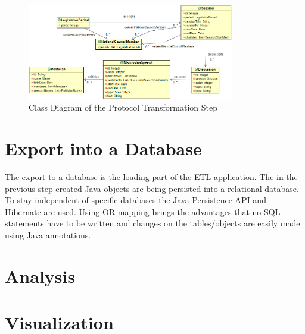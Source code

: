 \begin{figure}
	\centering
	\includegraphics[width=341px]{imgs/session_class_diagram}
	\caption{Class Diagram of the Protocol Transformation Step}
	\label{fig:session_class_diagram}
\end{figure}


\section{Export into a Database}
\label{sec:export_db}
The export to a database is the loading part of the ETL application. The in the previous step created Java objects are being persisted into a relational database. To stay independent of specific databases the Java Persistence API and Hibernate are used. Using OR-mapping brings the advantages that no SQL-statements have to be written and changes on the tables/objects are easily made using Java annotations.

\section{Analysis}
\label{sec:analysis}

\section{Visualization}
\label{sec:visualization}
